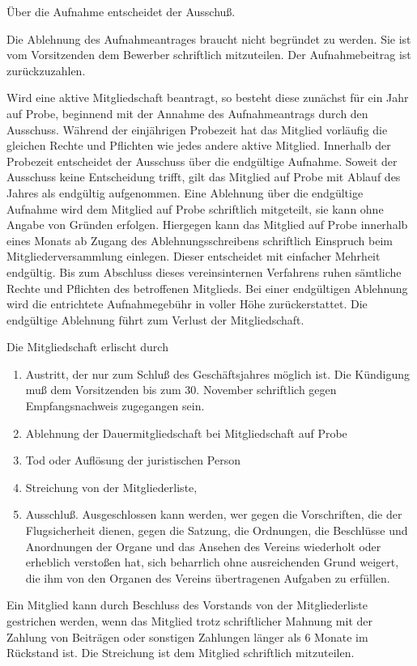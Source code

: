 \documentclass[10pt,a4paper,parskip=half]{scrartcl}
\begin{document}
\begin{contract}
\begin{multicols}{2}
    Über die Aufnahme entscheidet der Ausschuß.
    
    Die Ablehnung des Aufnahmeantrages braucht nicht begründet zu werden.
    Sie ist vom Vorsitzenden dem Bewerber schriftlich mitzuteilen.
    Der Aufnahmebeitrag ist zurückzuzahlen.

    Wird eine aktive Mitgliedschaft beantragt,
    so besteht diese zunächst für ein Jahr auf Probe,
    beginnend mit der Annahme des Aufnahmeantrags durch den Ausschuss.
    Während der einjährigen Probezeit hat das Mitglied vorläufig die gleichen Rechte und Pflichten wie jedes andere aktive Mitglied.
    Innerhalb der Probezeit entscheidet der Ausschuss über die endgültige Aufnahme.
    Soweit der Ausschuss keine Entscheidung trifft,
    gilt das Mitglied auf Probe mit Ablauf des Jahres als endgültig aufgenommen.
    Eine Ablehnung über die endgültige Aufnahme wird dem Mitglied auf Probe schriftlich mitgeteilt,
    sie kann ohne Angabe von Gründen erfolgen.
    Hiergegen kann das Mitglied auf Probe innerhalb eines Monats ab Zugang des Ablehnungsschreibens schriftlich Einspruch beim Mitgliederversammlung einlegen.
    Dieser entscheidet mit einfacher Mehrheit endgültig.
    Bis zum Abschluss dieses vereinsinternen Verfahrens ruhen sämtliche Rechte und Pflichten des betroffenen Mitglieds.
    Bei einer endgültigen Ablehnung wird die entrichtete Aufnahmegebühr in voller Höhe zurückerstattet.
    Die endgültige Ablehnung führt zum Verlust der Mitgliedschaft.
    
    \label{C:ErloeschenDerMitgliedschaft}
    Die Mitgliedschaft erlischt durch
    \begin{enumerate}[label=\alph*)]
      \item Austritt,
            der nur zum Schluß des Geschäftsjahres möglich ist.
            Die Kündigung muß dem Vorsitzenden bis zum 30. November schriftlich gegen Empfangsnachweis zugegangen sein.
      \item Ablehnung der Dauermitgliedschaft bei Mitgliedschaft auf Probe
      \item Tod oder Auflösung der juristischen Person
      \item Streichung von der Mitgliederliste,            
      \item{Ausschluß.} Ausgeschlossen kann werden,
            wer gegen die Vorschriften,
            die der Flugsicherheit dienen,
            gegen die Satzung,
            die Ordnungen,
            die Beschlüsse und Anordnungen der Organe und das Ansehen des Vereins wiederholt oder erheblich verstoßen hat,
            sich beharrlich ohne ausreichenden Grund weigert,
            die ihm von den Organen des Vereins übertragenen Aufgaben zu erfüllen.\label{S:Ausschluss}
    \end{enumerate}
    Ein Mitglied kann durch Beschluss des Vorstands von der Mitgliederliste gestrichen werden,
    wenn das Mitglied trotz schriftlicher Mahnung mit der Zahlung von Beiträgen oder sonstigen Zahlungen länger als 6 Monate im Rückstand ist.
    Die Streichung ist dem Mitglied schriftlich mitzuteilen.
    

\end{multicols}
\end{contract}
\end{document}

